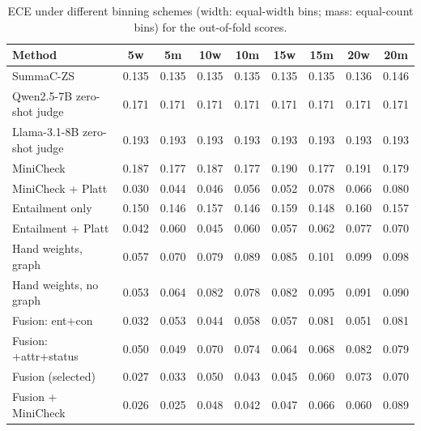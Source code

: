 \begin{table}[htbp]
\centering
\caption{ECE under different binning schemes (width: equal-width bins; mass: equal-count bins) for the out-of-fold scores.}
\label{tab:ecevar}
\small
\begin{tabular}{@{}lcccccccc@{}}
\toprule
Method & 5w & 5m & 10w & 10m & 15w & 15m & 20w & 20m \\
\midrule
SummaC-ZS & 0.135 & 0.135 & 0.135 & 0.135 & 0.135 & 0.135 & 0.136 & 0.146 \\
Qwen2.5-7B zero-shot judge & 0.171 & 0.171 & 0.171 & 0.171 & 0.171 & 0.171 & 0.171 & 0.171 \\
Llama-3.1-8B zero-shot judge & 0.193 & 0.193 & 0.193 & 0.193 & 0.193 & 0.193 & 0.193 & 0.193 \\
MiniCheck & 0.187 & 0.177 & 0.187 & 0.177 & 0.190 & 0.177 & 0.191 & 0.179 \\
MiniCheck + Platt & 0.030 & 0.044 & 0.046 & 0.056 & 0.052 & 0.078 & 0.066 & 0.080 \\
Entailment only & 0.150 & 0.146 & 0.157 & 0.146 & 0.159 & 0.148 & 0.160 & 0.157 \\
Entailment + Platt & 0.042 & 0.060 & 0.045 & 0.060 & 0.057 & 0.062 & 0.077 & 0.070 \\
Hand weights, graph & 0.057 & 0.070 & 0.079 & 0.089 & 0.085 & 0.101 & 0.099 & 0.098 \\
Hand weights, no graph & 0.053 & 0.064 & 0.082 & 0.078 & 0.082 & 0.095 & 0.091 & 0.090 \\
Fusion: ent+con & 0.032 & 0.053 & 0.044 & 0.058 & 0.057 & 0.081 & 0.051 & 0.081 \\
Fusion: +attr+status & 0.050 & 0.049 & 0.070 & 0.074 & 0.064 & 0.068 & 0.082 & 0.079 \\
Fusion (selected) & 0.027 & 0.033 & 0.050 & 0.043 & 0.045 & 0.060 & 0.073 & 0.070 \\
Fusion + MiniCheck & 0.026 & 0.025 & 0.048 & 0.042 & 0.047 & 0.066 & 0.060 & 0.089 \\
\bottomrule
\end{tabular}
\end{table}